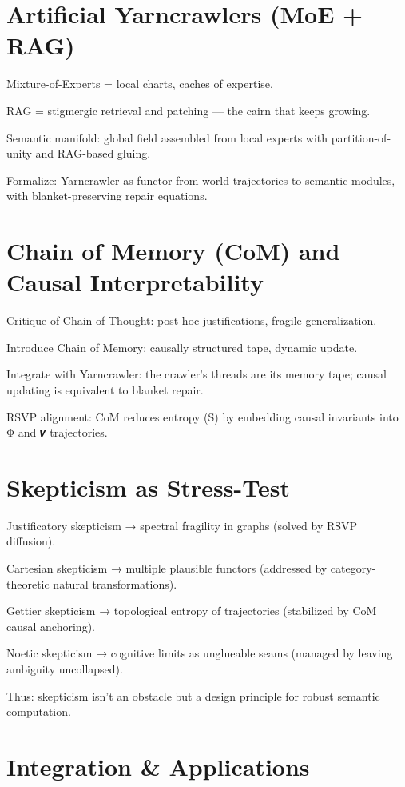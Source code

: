 \documentclass{article}
\begin{document}
\section{Artificial Yarncrawlers (MoE + RAG)}

Mixture-of-Experts = local charts, caches of expertise.

RAG = stigmergic retrieval and patching — the cairn that keeps growing.

Semantic manifold: global field assembled from local experts with partition-of-unity and RAG-based gluing.

Formalize: Yarncrawler as functor from world-trajectories to semantic modules, with blanket-preserving repair equations.

\section{Chain of Memory (CoM) and Causal Interpretability}

Critique of Chain of Thought: post-hoc justifications, fragile generalization.

Introduce Chain of Memory: causally structured tape, dynamic update.

Integrate with Yarncrawler: the crawler’s threads are its memory tape; causal updating is equivalent to blanket repair.

RSVP alignment: CoM reduces entropy (S) by embedding causal invariants into Φ and 𝒗 trajectories.

\section{Skepticism as Stress-Test}

Justificatory skepticism → spectral fragility in graphs (solved by RSVP diffusion).

Cartesian skepticism → multiple plausible functors (addressed by category-theoretic natural transformations).

Gettier skepticism → topological entropy of trajectories (stabilized by CoM causal anchoring).

Noetic skepticism → cognitive limits as unglueable seams (managed by leaving ambiguity uncollapsed).

Thus: skepticism isn’t an obstacle but a design principle for robust semantic computation.

\section{Integration \& Applications}
\end{document}
